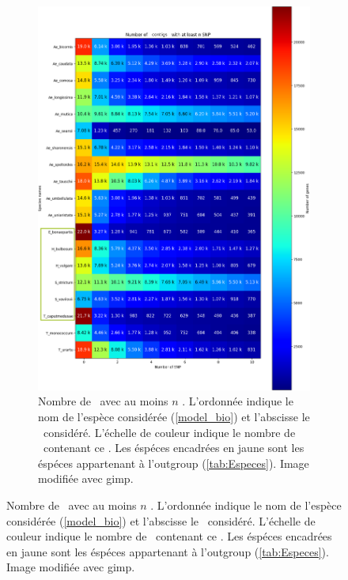 \documentclass[../main]{subfiles} %
\begin{document}
\addto\extrasfrench{\protected\edef:{\unexpanded\expandafter{:}}}

\begin{landscape}
\begin{figure}[p]
    \centering
    \begin{subfigure}[b]{0.55\paperwidth}
        \centering
        \includegraphics[width=\textwidth]{../Illustrations/Classic_Heatmap_SNP.png}
        \caption{Nombre de \contigs avec au moins $n$ \SNP. L'ordonnée indique le nom de l'espèce considérée (\ref{model_bio}) et l'abscisse le \NbSNP considéré. L'échelle de couleur indique le nombre de \contigs contenant ce \NbSNP. Les éspéces encadrées en jaune sont les éspéces appartenant à l'\gls{outgroup} (\cref{tab:Especes}). Image modifiée avec \gls{gimp}. \\
}
\end{subfigure}
\end{figure}
\end{landscape}
\end{document}
